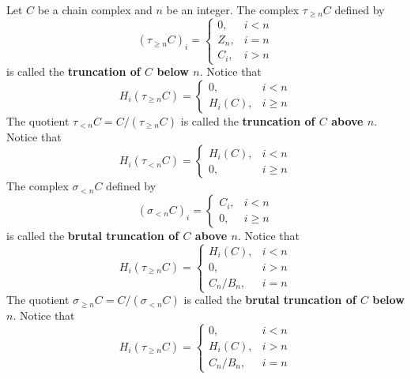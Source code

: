 \begin{defn} Let $C$ be a chain complex and $n$ be an integer. The complex $\tau_{\geq n}C$ defined by
\begin{equation}
(\tau_{\geq n}C)_i=\begin{cases}
0, &i<n\\
Z_n, & i=n\\
C_i,&i>n
\end{cases}
\end{equation}
is called the \textbf{truncation of $C$ below $n$}. Notice that
\begin{equation}
H_i(\tau_{\geq n}C)=\begin{cases}
0,&i<n\\
H_i(C),&i\geq n
\end{cases}
\end{equation}
The quotient $\tau_{<n}C=C/(\tau_{\geq n}C)$ is called the \textbf{truncation of $C$ above $n$}. Notice that
\begin{equation}
H_i(\tau_{< n}C)=\begin{cases}
H_i(C),&i<n\\
0,&i\geq n
\end{cases}
\end{equation}
The complex $\sigma_{<n}C$ defined by
\begin{equation}
(\sigma_{<n}C)_i=\begin{cases}
C_i,&i<n\\
0,&i\geq n
\end{cases}
\end{equation}
is called the \textbf{brutal truncation of $C$ above $n$}. Notice that
\begin{equation}
H_i(\tau_{\geq n}C)=\begin{cases}
H_i(C),&i<n\\
0,&i> n\\
C_n/B_n,&i=n
\end{cases}
\end{equation}
The quotient $\sigma_{\geq n}C=C/(\sigma_{<n}C)$ is called the \textbf{brutal truncation of $C$ below $n$}. Notice that
\begin{equation}
H_i(\tau_{\geq n}C)=\begin{cases}
0,&i<n\\
H_i(C),&i> n\\
C_n/B_n,&i=n
\end{cases}
\end{equation}
\end{defn}

